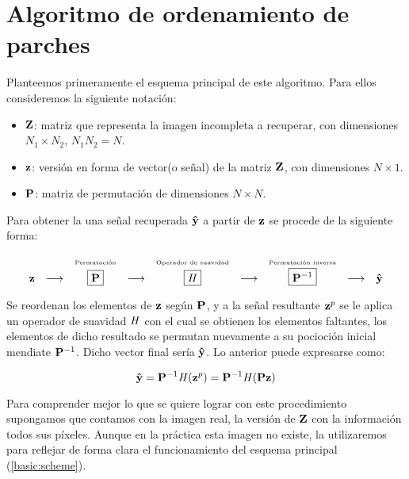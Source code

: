 \chapter{Algoritmo de ordenamiento de parches}\label{chapter:PRA} %

Planteemos primeramente el esquema principal de este algoritmo. Para ellos consideremos la siguiente notaci\'on:

\begin{itemize}
	\item $\Z$: matriz que representa la imagen incompleta a recuperar, con dimensiones $N_1 \times N_2$, $N_1N_2 = N$.
	\item $\z$: versión en forma de vector(o señal) de la matriz $\Z$, con dimensiones $N \times 1$.
	\item $\P$: matriz de permutaci\'on de dimensiones $N \times N$.
\end{itemize}

Para obtener la una señal recuperada $\yhat$ a partir de $\z$ se procede de la siguiente forma:

\begin{equation}
	\begin{array}[t]{ccccccccc}
	& & \mbox{\tiny{Permutaci\'on}} & & \mbox{\tiny{Operador de suavidad}} & & \mbox{\tiny{Permutaci\'on inversa}} & &\\
	\z & \longrightarrow & \boxed{\P} & \longrightarrow & \boxed{\H} & \longrightarrow & \boxed{\P^{-1}} & \longrightarrow & \yhat \\
	\end{array}
	\label{basic:scheme}
\end{equation}

Se reordenan los elementos de $\z$ seg\'un $\P$, y a la señal resultante $\z^p$ se le aplica un operador de suavidad $\H$ con el cual se obtienen los elementos faltantes, los elementos de dicho resultado se permutan nuevamente a su pocioci\'on inicial mendiate $\P^{-1}$. Dicho vector final ser\'ia $\yhat$. Lo anterior puede expresarse como:

\begin{equation}
\yhat = \P^{-1}\H(\z^p) = \P^{-1}\H(\P\z)
\label{basic:formula}
\end{equation}

Para comprender mejor lo que se quiere lograr con este procedimiento supongamos que contamos con la imagen real, la versi\'on de $\Z$ con la informaci\'on todos sus p\'ixeles. Aunque en la pr\'actica esta imagen no existe, la utilizaremos para reflejar de forma clara el funcionamiento del esquema principal (\ref{basic:scheme}).

